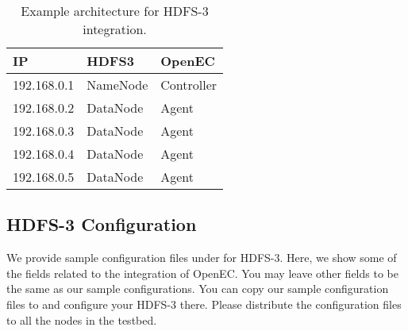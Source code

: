 \documentclass[letterpaper,12pt]{article}
\newcommand{\openec}{{\sf\small OpenEC}\xspace}
\begin{document}
\begin{table}[h]
\centering
\footnotesize
\renewcommand{\arraystretch}{1.1}
\begin{tabular}{|l|l|l|}
\hline
IP & HDFS3 & OpenEC \\
\hline
\hline
192.168.0.1 & NameNode & Controller \\
\hline
192.168.0.2 & DataNode & Agent \\
\hline
192.168.0.3 & DataNode & Agent \\
\hline
192.168.0.4 & DataNode & Agent \\
\hline
192.168.0.5 & DataNode & Agent \\
\hline
\end{tabular}
\vspace{-3pt}
\caption{Example architecture for HDFS-3 integration.}
\label{tab:hdfs3arch}
\end{table}

\subsection{HDFS-3 Configuration}

We provide sample configuration files under
 for HDFS-3.  Here, we show some
of the fields related to the integration of \openec.  You may leave other
fields to be the same as our sample configurations. You can copy our sample
configuration files to  and configure your
HDFS-3 there. Please distribute the configuration files to all the nodes in
the testbed.
\end{document}
